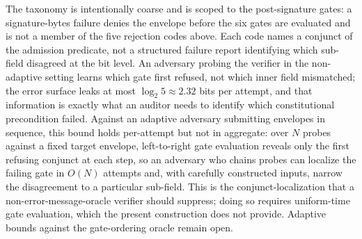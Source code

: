 The taxonomy is intentionally coarse and is scoped to the post-signature gates: a signature-bytes failure denies the envelope before the six gates are evaluated and is not a member of the five rejection codes above. Each code names a conjunct of the admission predicate, not a structured failure report identifying which sub-field disagreed at the bit level. An adversary probing the verifier in the non-adaptive setting learns which gate first refused, not which inner field mismatched; the error surface leaks at most $\log_2 5 \approx 2.32$ bits per attempt, and that information is exactly what an auditor needs to identify which constitutional precondition failed. Against an adaptive adversary submitting envelopes in sequence, this bound holds per-attempt but not in aggregate: over $N$ probes against a fixed target envelope, left-to-right gate evaluation reveals only the first refusing conjunct at each step, so an adversary who chains probes can localize the failing gate in $O(N)$ attempts and, with carefully constructed inputs, narrow the disagreement to a particular sub-field. This is the conjunct-localization that a non-error-message-oracle verifier should suppress; doing so requires uniform-time gate evaluation, which the present construction does not provide. Adaptive bounds against the gate-ordering oracle remain open.
